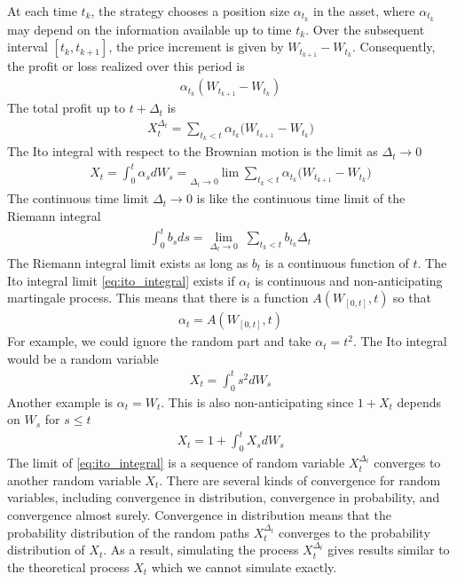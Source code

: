At each time $t_k$, the strategy chooses a position size $\alpha_{t_k}$ in the asset, where $\alpha_{t_k}$ may depend on the information available up to time $t_k$. Over the subsequent interval $[t_k, t_{k+1}]$, the price increment is given by $W_{t_{k+1}} - W_{t_k}$. Consequently, the profit or loss realized over this period is
\begin{align*}
\alpha_{t_k}(W_{t_{k+1}} - W_{t_k})
\end{align*}
The total profit up to $t+\Delta_t$ is
\begin{align}\label{eq:discrete_time_sum_profit}
X_t^{\Delta_t} = \sum_{t_k < t} \alpha_{t_k} \big(W_{t_{k+1}} - W_{t_k} \big)
\end{align}
The Ito integral with respect to the Brownian motion is the limit as $\Delta_t \rightarrow 0$
\begin{align}\label{eq:ito_integral}
X_t=\int_0^t \alpha_s dW_s = \underset{\Delta_t \rightarrow 0}\;{\lim} \sum_{t_k < t} \alpha_{t_k} \big(W_{t_{k+1}}-W_{t_k} \big)
\end{align}
The continuous time limit $\Delta_t \rightarrow 0$ is like the continuous time limit of the Riemann integral
\begin{align*}
\int_0^t b_s ds = \underset{\Delta_t \rightarrow 0}{\lim}\; \sum_{t_k < t} b_{t_k} \Delta_t
\end{align*}
The Riemann integral limit exists as long as $b_t$ is a continuous function of $t$.
The Ito integral limit \eqref{eq:ito_integral} exists if $\alpha_t$ is continuous and non-anticipating martingale process. This means that there is a function $A(W_{[0,t]}, t)$ so that
\begin{align*}
\alpha_t = A(W_{[0,t]}, t)
\end{align*}
For example, we could ignore the random part and take $\alpha_t=t^2$. The Ito integral would be a random variable
\begin{align*}
X_t=\int_0^t s^2 dW_s
\end{align*}
Another example is $\alpha_t=W_t$. This is also non-anticipating since $1+X_t$ depends on $W_s$ for $s \leq t$
\begin{align*}
X_t=1 + \int_0^t X_s dW_s
\end{align*}
The limit of \eqref{eq:ito_integral} is a sequence of random variable $X_t^{\Delta_t}$ converges to another random variable $X_t$. There are several kinds of convergence for random variables, including convergence in distribution, convergence in probability, and convergence almost surely. Convergence in distribution means that the probability distribution of the random paths $X_t^{\Delta_t}$  converges to the probability distribution of  $X_t$. As a result, simulating the process $X_t^{\Delta_t}$ gives results similar to the theoretical process $X_t$ which we cannot simulate exactly.

